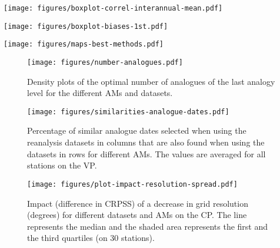 \documentclass{ametsoc}
\begin{document}
	\begin{figure*}[t]
		\noindent\texttt{[image: figures/boxplot-correl-interannual-mean.pdf]}\\
		\caption{Inter-annual correlation between the mean precipitation from the selected analogues and the observations for all stations and for all considered AMs and reanalysis datasets on both the CP and the VP. Same conventions as Fig. \ref{fig:comparison_values}.}
		\label{fig:correlation}
	\end{figure*}
	
	\begin{figure*}[t]
		\noindent\texttt{[image: figures/boxplot-biases-1st.pdf]}\\
		\caption{Same as Fig. \ref{fig:correlation}, but for relative biases.}
		\label{fig:biases}
	\end{figure*}
	
	\begin{figure*}[t]
		\noindent\texttt{[image: figures/maps-best-methods.pdf]}\\
		\caption{Best method per station for the different datasets. NR-2 and JRA-55C are not shown as they are similar to NR-1 and JRA-55 respectively. Background map: \textcopyright\ SwissTopo.}
		\label{fig:map_best_methods}
	\end{figure*}
	
	\begin{figure}[t]
		\noindent\texttt{[image: figures/number-analogues.pdf]}\\
		\caption{Density plots of the optimal number of analogues of the last analogy level for the different AMs and datasets.}
		\label{fig:number_analogues}
	\end{figure}
	
	\begin{figure}[t]
		\noindent\texttt{[image: figures/similarities-analogue-dates.pdf]}\\
		\caption{Percentage of similar analogue dates selected when using the reanalysis datasets in columns that are also found when using the datasets in rows for different AMs. The values are averaged for all stations on the VP.}
		\label{fig:similarities_analogue_dates}
	\end{figure}
	
	\begin{figure}[t]
		\noindent\texttt{[image: figures/plot-impact-resolution-spread.pdf]}\\
		\caption{Impact (difference in CRPSS) of a decrease in grid resolution (degrees) for different datasets and AMs on the CP. The line represents the median and the shaded area represents the first and the third quartiles (on 30 stations).}
		\label{fig:plot_impact_resolution}
	\end{figure}
	
\end{document}
